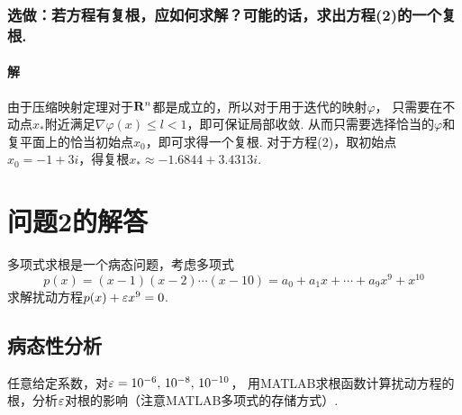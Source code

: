 \subsubsection{选做：若方程有复根，应如何求解？可能的话，求出方程(2)的一个复根.}
  \paragraph{解}
    由于压缩映射定理对于$\mathbf{R}^n$都是成立的，所以对于用于迭代的映射$\varphi$，
    只需要在不动点$x_*$附近满足$\nabla\varphi(x) \le l < 1$，即可保证局部收敛.
    从而只需要选择恰当的$\varphi$和复平面上的恰当初始点$x_0$，即可求得一个复根.
    对于方程(2)，取初始点$x_0 = -1+3i$，得复根$x_* \approx -1.6844 + 3.4313i$.


\newpage
\section{问题2的解答}
  多项式求根是一个病态问题，考虑多项式
  \[
    p(x) = (x-1)(x-2)\cdots(x-10) = a_0 + a_1x + \cdots + a_9x^9 + x^{10}
  \]
  求解扰动方程$p(x) + \varepsilon x^9 = 0$.

\subsection{病态性分析}
  任意给定系数，对$\varepsilon = 10^{-6},\,10^{-8},\,10^{-10}$，
  用MATLAB求根函数计算扰动方程的根，分析$\varepsilon$对根的影响（注意MATLAB多项式的存储方式）.
